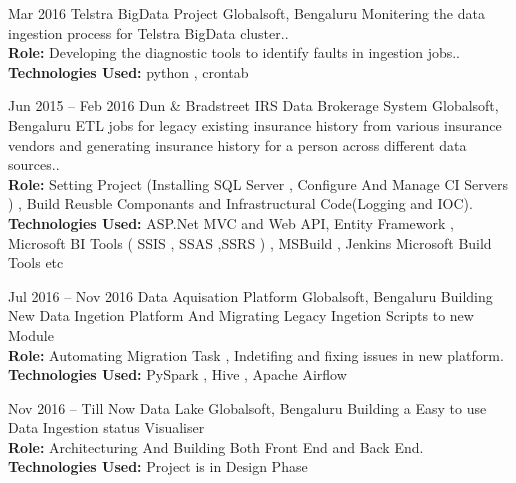\documentclass[]{friggeri-cv} %
\begin{document}
\begin{entrylist}
\entry
{Mar 2016}
{Telstra BigData Project}
{Globalsoft, Bengaluru}
{Monitering the data ingestion process for Telstra BigData cluster..\\
\textbf{Role:} Developing the diagnostic tools to identify faults in ingestion jobs..\\
\textbf{Technologies Used:} python , crontab}
\end{entrylist}

\begin{entrylist}
\entry
{Jun 2015 -- Feb 2016}
{Dun \& Bradstreet IRS Data Brokerage System}
{Globalsoft, Bengaluru}
{ETL jobs for legacy existing insurance history from various insurance vendors and generating insurance history for a person across different data sources..\\
\textbf{Role:} Setting Project (Installing SQL Server , Configure And Manage CI Servers ) ,  
Build Reusble Componants and Infrastructural Code(Logging and IOC).\\
\textbf{Technologies Used:} ASP.Net MVC and Web API, Entity Framework , Microsoft BI Tools ( SSIS , SSAS ,SSRS ) , 
MSBuild , Jenkins Microsoft Build Tools etc}
\end{entrylist}


\begin{entrylist}
\entry
{Jul 2016 -- Nov 2016}
{Data Aquisation Platform}
{Globalsoft, Bengaluru}
{Building New Data Ingetion Platform And Migrating Legacy Ingetion Scripts to new Module\\
\textbf{Role:} Automating Migration Task , Indetifing and fixing issues in new platform.\\
\textbf{Technologies Used:} PySpark , Hive , Apache Airflow}
\end{entrylist}

\begin{entrylist}
\entry
{Nov 2016 -- Till Now}
{Data Lake}
{Globalsoft, Bengaluru}
{Building a Easy to use Data Ingestion status Visualiser \\
\textbf{Role:} Architecturing And Building Both Front End and Back End.\\
\textbf{Technologies Used:} Project is in Design Phase}
\end{entrylist}

\end{document}
